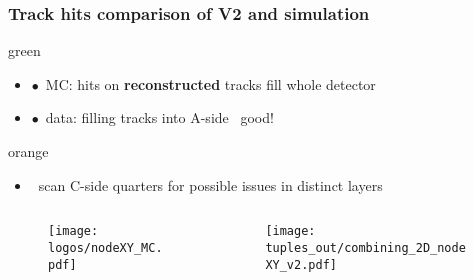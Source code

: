 \documentclass[aspectratio=1610, 12pt, xcolor=dvipsnames]{beamer}
\begin{document}
\begin{frame}\frametitle{Track hits comparison of V2 and simulation}
\begin{mybox}{green}{}
  \begin{itemize}
    \item $\bullet$\, MC: hits on \textbf{reconstructed} tracks fill whole detector
    \item $\bullet$\, data: filling tracks into A-side \to\, good!
  \end{itemize}
\end{mybox}
\begin{mybox}{orange}{}
  \begin{itemize}
    \item \to\, scan C-side quarters for possible issues in distinct layers
  \end{itemize}
\end{mybox}
  \begin{columns}
    \begin{column}[c]{0.48\textwidth}
      \begin{figure}
        \centering
        \texttt{[image: logos/nodeXY\_MC.pdf]}%
      \end{figure}
    \end{column}
    \begin{column}[c]{0.48\textwidth}
      \begin{figure}
        \centering
        \texttt{[image: tuples\_out/combining\_2D\_nodeXY\_v2.pdf]}%
      \end{figure}
    \end{column}
  \end{columns}
\end{frame}

\end{document}
